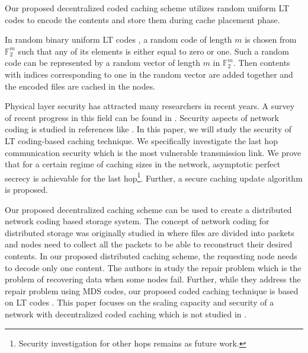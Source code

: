 \documentclass[10pt,journal]{IEEEtran}
\begin{document}
Our proposed decentralized coded caching scheme utilizes random uniform LT codes \cite{DBLP:conf/focs/Luby02, mackay2005fountain, DBLP:journals/tit/Shokrollahi06} to encode the contents and store them during cache placement phase.

In random binary uniform LT codes \cite{mackay2005fountain}, a random code of length $m$ is chosen from $\mathbb{F}_2^m$ such that any of its  elements is either equal to zero or one. Such a random code can be represented by a random vector of length $m$ in $\mathbb{F}_2^m$. Then contents with indices corresponding to one in the random vector are added together and the encoded files are cached in the nodes.

Physical layer security has attracted many researchers in recent years. A survey of recent progress in this field can be found in \cite{bloch2011physical,DBLP:journals/wc/ShiuCWHC11}. Security aspects of network coding is studied in references like \cite{lima2007random,cai2002secure, vahidian2015relay}. %
In this paper, we will study the security of  LT coding-based caching technique. We specifically investigate the last hop communication security which is the most vulnerable transmission link. We prove that for a certain regime of caching sizes in the network, asymptotic perfect secrecy is achievable for the last hop\footnote{Security investigation for other hops remains as future work.}. Further, a secure caching update algorithm is proposed.   

Our proposed decentralized caching scheme can be used to create a distributed network coding based storage system. The concept of network coding for distributed storage was originally studied in \cite{DBLP:journals/tit/DimakisGWWR10,DBLP:journals/pieee/DimakisRWS11} where files are divided into packets and nodes need to collect all the packets to be able to reconstruct their desired contents. In our proposed distributed caching scheme, the requesting node needs to decode only one content. The authors in \cite{DBLP:journals/tit/DimakisGWWR10, DBLP:journals/pieee/DimakisRWS11} study the repair problem which is the problem of recovering data when some nodes fail. Further, while they address the repair problem using  MDS codes,  our proposed coded caching technique is based on {LT codes \cite{DBLP:conf/focs/Luby02}.}  This paper focuses on the scaling capacity and   security of a network with decentralized coded caching which is not studied in  \cite{DBLP:journals/tit/DimakisGWWR10,DBLP:journals/pieee/DimakisRWS11}. %
\end{document}
